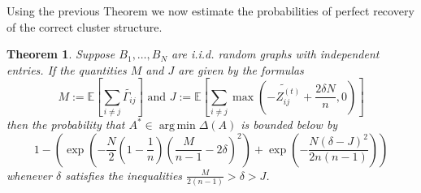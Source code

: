 \documentclass[12pt]{amsart}
\newtheorem{theorem}[lemma]{Theorem}
\theoremstyle{remark}
\DeclareMathOperator*{\argmin}{arg\,min}
\newcommand{\EE}{\mathbb{E}}
\begin{document}
Using the previous Theorem we now estimate the probabilities of perfect recovery of the correct cluster structure. 

\begin{theorem} Suppose $B_1,\dots, B_N$ are i.i.d. random graphs with independent entries. If the quantities $M$ and $J$ are given by the formulas 
\[ M:=\EE\left[\sum_{i\neq j}\widetilde{\Gamma_{ij}}\right]\text{ and }J:=\EE\left[\sum_{i\neq j}\max\left(\widetilde{-Z_{ij}^{(t)}}+\frac{2\delta N}{n},0\right)\right]\]
then the probability that $A^*\in \argmin \Delta(A)$ is bounded below by
\[1-\left(\exp\left( -\frac{N}{2}\left(1-\frac{1}{n}\right) \left(\frac{M}{n-1}-2\delta\right)^2\right)+\exp\left(-\frac{N(\delta-J)^2}{2n(n-1)}\right)\right)\]
whenever $\delta$ satisfies the inequalities $\frac{M}{2(n-1)}>\delta>J$. 
\end{theorem}
\end{document}
